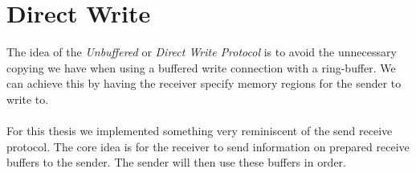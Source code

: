 \section{Direct Write}\label{sec:conn:direct_write}

The idea of the \emph{Unbuffered} or \emph{Direct Write Protocol} is to avoid the unnecessary copying we have when using
a buffered write connection with a ring-buffer. We can achieve this by having the receiver specify  memory 
regions for the sender to write to. 

\paragraph{} For this thesis we implemented something very reminiscent of the send receive protocol. The core idea is for
the receiver to send information on prepared receive buffers to the sender. The sender will then use these buffers in order. 



